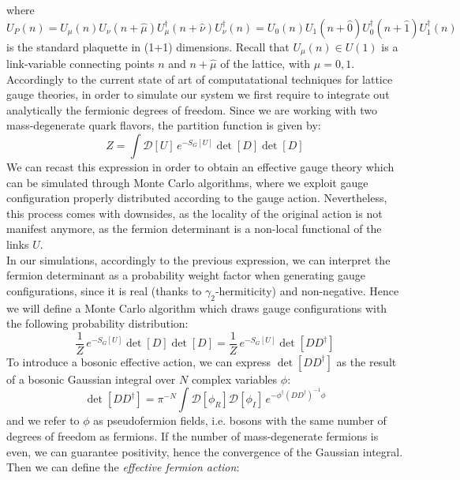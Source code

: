where
\begin{equation*}
    U_P(n) = U_\mu(n) U_\nu (n + \hat{\mu}) U^\dagger_\mu(n+\hat{\nu}) U^\dagger_\nu(n) = U_0(n) U_1 (n + \hat{0}) U^\dagger_0(n+\hat{1}) U^\dagger_1(n)
\end{equation*}
is the standard plaquette in (1+1) dimensions. Recall that $U_\mu(n) \in U(1)$ is a link-variable connecting points $n$ and $n + \hat{\mu}$ of the lattice, with $\mu = 0, 1$.
Accordingly to the current state of art of computatational techniques for lattice gauge theories, in order to simulate our system we first require to integrate out analytically the fermionic degrees of freedom. Since we are working with two mass-degenerate quark flavors, the partition function is given by:
\begin{equation*}
    Z = \int \mathcal{D}[U]\, e^{-S_G[U]} \det[D] \det[D]
\end{equation*}
We can recast this expression in order to obtain an effective gauge theory which can be simulated through Monte Carlo algorithms, where we exploit gauge configuration properly distributed according to the gauge action. Nevertheless, this process comes with downsides, as the locality of the original action is not manifest anymore, as the fermion determinant is a non-local functional of the links $U$. 
\\ In our simulations, accordingly to the previous expression, we can interpret the fermion determinant as a probability weight factor when generating gauge configurations, since it is real (thanks to $\gamma_2$-hermiticity) and non-negative. Hence we will define a Monte Carlo algorithm which draws gauge configurations with the following probability distribution:
\begin{equation*}
    \frac{1}{Z}\,e^{-S_G[U]} \det[D] \det[D] =  \frac{1}{Z}\,e^{-S_G[U]} \det[D D^\dagger]
\end{equation*}
To introduce a bosonic effective action, we can express $\det[DD^\dagger]$ as the result of a bosonic Gaussian integral over $N$ complex variables $\phi$:
\begin{equation}
    \det[DD^\dagger] =  \pi^{-N} \int \mathcal{D}[\phi_R] \mathcal{D}[\phi_I] \, e^{-\phi^\dagger (DD^\dagger)^{-1} \phi}
\end{equation}
and we refer to $\phi$ as pseudofermion fields, i.e. bosons with the same number of degrees of freedom as fermions. If the number of mass-degenerate fermions is even, we can guarantee positivity, hence the convergence of the Gaussian integral.
\\ Then we can define the \textit{effective fermion action}:
